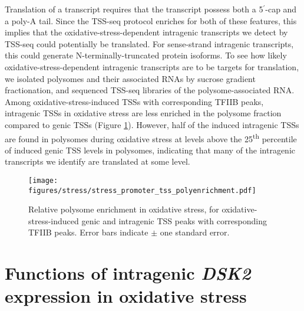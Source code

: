 Translation of a transcript requires that the transcript possess both a 5$^\prime$-cap and a poly-A tail.
Since the TSS-seq protocol enriches for both of these features, this implies that the oxidative-stress-dependent intragenic transcripts we detect by TSS-seq could potentially be translated.
For sense-strand intragenic transcripts, this could generate N-terminally-truncated protein isoforms.
To see how likely oxidative-stress-dependent intragenic transcripts are to be targets for translation, we isolated polysomes and their associated RNAs by sucrose gradient fractionation, and sequenced TSS-seq libraries of the polysome-associated RNA.
Among oxidative-stress-induced TSSs with corresponding TFIIB peaks, intragenic TSSs in oxidative stress are less enriched in the polysome fraction compared to genic TSSs (Figure \ref{fig:stress_promoter_tss_polyenrichment}).
However, half of the induced intragenic TSSs are found in polysomes during oxidative stress at levels above the 25\textsuperscript{th} percentile of induced genic TSS levels in polysomes, indicating that many of the intragenic transcripts we identify are translated at some level.

\begin{figure}[h]
    \texttt{[image: figures/stress/stress\_promoter\_tss\_polyenrichment.pdf]}
    \caption[Relative polysome enrichment in oxidative stress, for oxidative-stress-induced genic and intragenic promoters.]{Relative polysome enrichment in oxidative stress, for oxidative-stress-induced genic and intragenic TSS peaks with corresponding TFIIB peaks. Error bars indicate $\pm$ one standard error.}
    \label{fig:stress_promoter_tss_polyenrichment}
\end{figure}

\section{Functions of intragenic \textit{DSK2} expression in oxidative stress}

